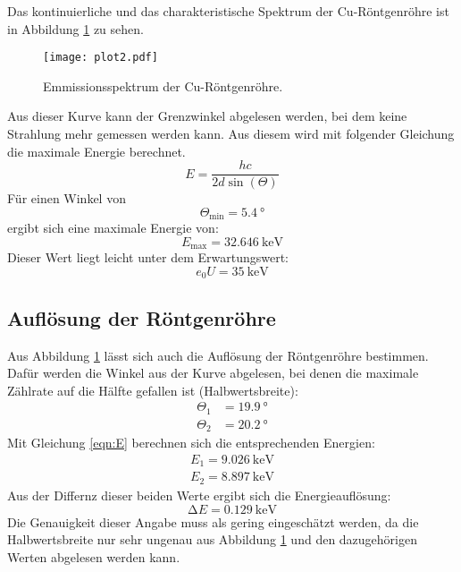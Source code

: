 Das kontinuierliche und das charakteristische Spektrum der Cu-Röntgenröhre ist in Abbildung \ref{fig:plot2} zu sehen.
\begin{figure}
  \centering
  \texttt{[image: plot2.pdf]}
  \caption{Emmissionsspektrum der Cu-Röntgenröhre.}
  \label{fig:plot2}
\end{figure}
Aus dieser Kurve kann der Grenzwinkel abgelesen werden, bei dem keine Strahlung mehr gemessen werden kann.
Aus diesem wird mit folgender Gleichung die maximale Energie berechnet.
\begin{equation}
  E = \frac{h c}{2d \sin(\Theta)}
  \label{eqn:E}
\end{equation}
Für einen Winkel von
\begin{equation*}
  \Theta_\text{min} = \SI{5.4}{\degree}
\end{equation*}
ergibt sich eine maximale Energie von:
\begin{equation*}
  E_\text{max} = \SI{32.646}{\kilo\eV}
\end{equation*}
Dieser Wert liegt leicht unter dem Erwartungswert:
\begin{equation*}
  e_0 U = \SI{35}{\kilo\eV}
\end{equation*}
\FloatBarrier

\subsection{Auflösung der Röntgenröhre}

Aus Abbildung \ref{fig:plot2} lässt sich auch die Auflösung der Röntgenröhre bestimmen.
Dafür werden die Winkel aus der Kurve abgelesen, bei denen die maximale Zählrate auf die Hälfte gefallen ist (Halbwertsbreite):
\begin{align*}
  \Theta_1 &= \SI{19.9}{\degree} \\
  \Theta_2 &= \SI{20.2}{\degree}
\end{align*}
Mit Gleichung \eqref{eqn:E} berechnen sich die entsprechenden Energien:
\begin{align*}
  E_1 = \SI{9.026}{\kilo\eV} \\
  E_2 = \SI{8.897}{\kilo\eV}
\end{align*}
Aus der Differnz dieser beiden Werte ergibt sich die Energieauflösung:
\begin{equation*}
 \increment E = \SI{0.129}{\kilo\eV}
\end{equation*}
Die Genauigkeit dieser Angabe muss als gering eingeschätzt werden, da die Halbwertsbreite nur sehr ungenau aus Abbildung \ref{fig:plot2} und den dazugehörigen Werten abgelesen werden kann.

